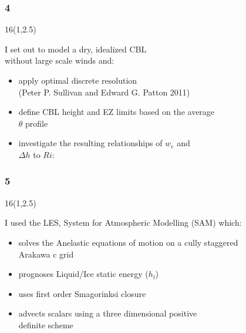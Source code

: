 \documentclass{beamer}
\newcommand\FrameText[1]{
\begin{textblock}{16}(1,2.5)
\raggedright #1
\end{textblock}}
\begin{document}
\begin{frame}
\frametitle{4}
\fontsize{12pt}{7.2}\selectfont
\FrameText{I set out to model a dry, idealized CBL\\
without large scale winds and:
\vspace{10mm}
\begin{itemize}
\item apply optimal discrete resolution\\
(Peter P. Sullivan and Edward G. Patton 2011)
\vspace{10mm}  
\item define CBL height and EZ limits based on the average \\
$\theta$ profile
\vspace{10mm}
\item investigate the resulting relationships of $w_{e}$ and \\
 $\Delta h$ to $Ri$:
\end{itemize}
}
\end{frame}


\begin{frame}
\frametitle{5}
\fontsize{12pt}{7.2}\selectfont
\FrameText{I used the LES, System for Atmospheric Modelling (SAM) which:
\vspace{7mm}
\begin{itemize}
\item solves the Anelastic equations of motion on a cully staggered\\
Arakawa c grid
\vspace{7mm} 
\item prognoses Liquid/Ice static energy ($h_{l}$) 
\vspace{7mm}
\item uses first order Smagorinksi closure
\vspace{7mm}
\item advects scalars using a three dimensional positive\\
definite scheme
\end{itemize}
}
\end{frame}
\end{document}
